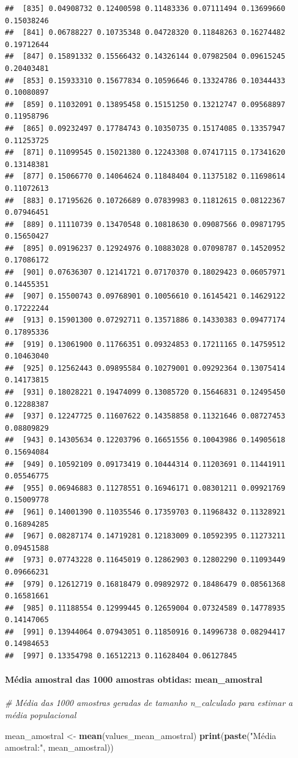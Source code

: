 \documentclass[
]{article}
\newenvironment{Shaded}{\begin{snugshade}}{\end{snugshade}}
\newcommand{\CommentTok}[1]{\textcolor[rgb]{0.56,0.35,0.01}{\textit{#1}}}
\newcommand{\FunctionTok}[1]{\textcolor[rgb]{0.13,0.29,0.53}{\textbf{#1}}}
\newcommand{\NormalTok}[1]{#1}
\newcommand{\OtherTok}[1]{\textcolor[rgb]{0.56,0.35,0.01}{#1}}
\newcommand{\StringTok}[1]{\textcolor[rgb]{0.31,0.60,0.02}{#1}}
\begin{document}
\begin{verbatim}
##  [835] 0.04908732 0.12400598 0.11483336 0.07111494 0.13699660 0.15038246
##  [841] 0.06788227 0.10735348 0.04728320 0.11848263 0.16274482 0.19712644
##  [847] 0.15891332 0.15566432 0.14326144 0.07982504 0.09615245 0.20403481
##  [853] 0.15933310 0.15677834 0.10596646 0.13324786 0.10344433 0.10080897
##  [859] 0.11032091 0.13895458 0.15151250 0.13212747 0.09568897 0.11958796
##  [865] 0.09232497 0.17784743 0.10350735 0.15174085 0.13357947 0.11253725
##  [871] 0.11099545 0.15021380 0.12243308 0.07417115 0.17341620 0.13148381
##  [877] 0.15066770 0.14064624 0.11848404 0.11375182 0.11698614 0.11072613
##  [883] 0.17195626 0.10726689 0.07839983 0.11812615 0.08122367 0.07946451
##  [889] 0.11110739 0.13470548 0.10818630 0.09087566 0.09871795 0.15650427
##  [895] 0.09196237 0.12924976 0.10883028 0.07098787 0.14520952 0.17086172
##  [901] 0.07636307 0.12141721 0.07170370 0.18029423 0.06057971 0.14455351
##  [907] 0.15500743 0.09768901 0.10056610 0.16145421 0.14629122 0.17222244
##  [913] 0.15901300 0.07292711 0.13571886 0.14330383 0.09477174 0.17895336
##  [919] 0.13061900 0.11766351 0.09324853 0.17211165 0.14759512 0.10463040
##  [925] 0.12562443 0.09895584 0.10279001 0.09292364 0.13075414 0.14173815
##  [931] 0.18028221 0.19474099 0.13085720 0.15646831 0.12495450 0.12288387
##  [937] 0.12247725 0.11607622 0.14358858 0.11321646 0.08727453 0.08809829
##  [943] 0.14305634 0.12203796 0.16651556 0.10043986 0.14905618 0.15694084
##  [949] 0.10592109 0.09173419 0.10444314 0.11203691 0.11441911 0.05546775
##  [955] 0.06946883 0.11278551 0.16946171 0.08301211 0.09921769 0.15009778
##  [961] 0.14001390 0.11035546 0.17359703 0.11968432 0.11328921 0.16894285
##  [967] 0.08287174 0.14719281 0.12183009 0.10592395 0.11273211 0.09451588
##  [973] 0.07743228 0.11645019 0.12862903 0.12802290 0.11093449 0.09666231
##  [979] 0.12612719 0.16818479 0.09892972 0.18486479 0.08561368 0.16581661
##  [985] 0.11188554 0.12999445 0.12659004 0.07324589 0.14778935 0.14147065
##  [991] 0.13944064 0.07943051 0.11850916 0.14996738 0.08294417 0.14984653
##  [997] 0.13354798 0.16512213 0.11628404 0.06127845
\end{verbatim}

\paragraph{Média amostral das 1000 amostras obtidas:
mean\_amostral}\label{muxe9dia-amostral-das-1000-amostras-obtidas-mean_amostral}

\begin{Shaded}
\begin{Highlighting}[]
\CommentTok{\# Média das 1000 amostras geradas de tamanho n\_calculado para estimar a média populacional}

\NormalTok{mean\_amostral }\OtherTok{\textless{}{-}} \FunctionTok{mean}\NormalTok{(values\_mean\_amostral)}
\FunctionTok{print}\NormalTok{(}\FunctionTok{paste}\NormalTok{(}\StringTok{"Média amostral:"}\NormalTok{, mean\_amostral))}
\end{Highlighting}
\end{Shaded}
\end{document}
